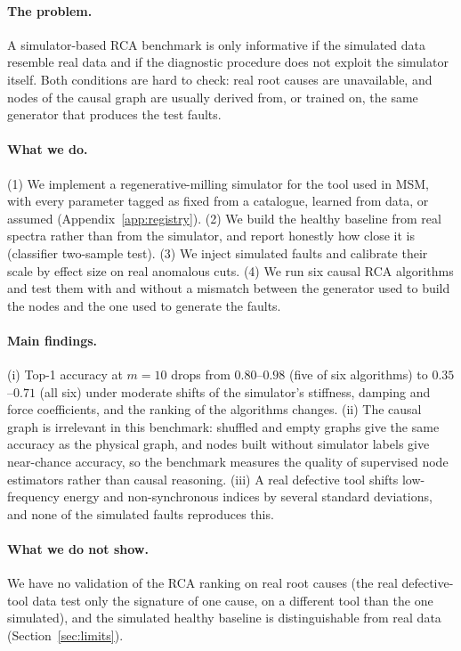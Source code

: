 \documentclass[11pt]{article}
\begin{document}
\paragraph{The problem.}
A simulator-based RCA benchmark is only informative if the simulated data resemble real data and if the diagnostic procedure does not exploit the simulator itself.
Both conditions are hard to check: real root causes are unavailable, and nodes of the causal graph are usually derived from, or trained on, the same generator that produces the test faults.

\paragraph{What we do.}
(1) We implement a regenerative-milling simulator for the tool used in MSM, with every parameter tagged as fixed from a catalogue, learned from data, or assumed (Appendix~\ref{app:registry}).
(2) We build the healthy baseline from real spectra rather than from the simulator, and report honestly how close it is (classifier two-sample test).
(3) We inject simulated faults and calibrate their scale by effect size on real anomalous cuts.
(4) We run six causal RCA algorithms and test them with and without a mismatch between the generator used to build the nodes and the one used to generate the faults.

\paragraph{Main findings.}
(i) Top-1 accuracy at $m{=}10$ drops from $0.80$--$0.98$ (five of six algorithms) to $0.35$--$0.71$ (all six) under moderate shifts of the simulator's stiffness, damping and force coefficients, and the ranking of the algorithms changes.
(ii) The causal graph is irrelevant in this benchmark: shuffled and empty graphs give the same accuracy as the physical graph, and nodes built without simulator labels give near-chance accuracy, so the benchmark measures the quality of supervised node estimators rather than causal reasoning.
(iii) A real defective tool shifts low-frequency energy and non-synchronous indices by several standard deviations, and none of the simulated faults reproduces this.

\paragraph{What we do not show.}
We have no validation of the RCA ranking on real root causes (the real defective-tool data test only the signature of one cause, on a different tool than the one simulated), and the simulated healthy baseline is distinguishable from real data (Section~\ref{sec:limits}).
\end{document}
